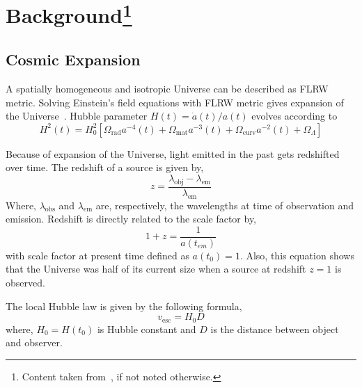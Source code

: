 \section[Background]{Background\footnote{Content taken from~\cite{manual}, if not noted otherwise.}}
\subsection{Cosmic Expansion}
A spatially homogeneous and isotropic Universe can be described as FLRW metric. Solving Einstein's field equations with FLRW metric gives expansion of the Universe~\cite{TEU}. Hubble parameter $H(t)=\dot{a}(t)/a(t)$ evolves according to
\begin{equation}
H^2(t) = H_0^2 \left[ \Omega_\text{rad} a^{-4}(t) + \Omega_\text{mat}a^{-3}(t) + \Omega_\text{curv}a^{-2} (t) + \Omega_\Lambda \right]
\end{equation}

Because of expansion of the Universe, light emitted in the past gets redshifted over time. The redshift of a source is given by,
\begin{equation}
z=\frac{\lambda_\text{obj}-\lambda_\text{em}}{\lambda_\text{em}}
\label{math:z}
\end{equation}
\noindent
Where, $\lambda_\text{obs}$ and $\lambda_\text{em}$ are, respectively, the wavelengths at time of observation and emission.
Redshift is directly related to the scale factor by,
\begin{equation}
1+z=\frac{1}{a(t_{em})}
\end{equation}
with scale factor at present time defined as $a(t_0) = 1$. Also, this equation shows that the Universe was half of its current size when a source at redshift $z= 1$ is observed.

The local Hubble law is given by the following formula,\\
 \begin{equation}
    v_\text{esc}=H_{0}D
 \label{Hubble}
 \end{equation}
 where, $H_{0} = H(t_0)$ is Hubble constant and $D$ is the distance between object and observer.
  
